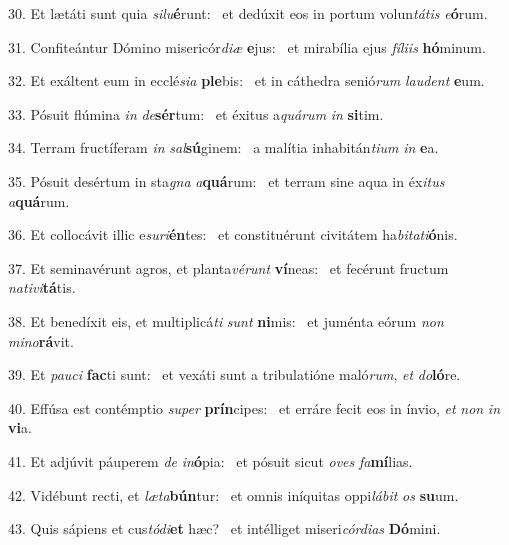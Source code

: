 30. Et lætáti sunt quia \textit{si}\textit{lu}\textbf{é}runt: \ast\  et dedúxit eos in portum volun\textit{tá}\textit{tis} \textit{e}\textbf{ó}rum.\

31. Confiteántur Dómino misericór\textit{di}\textit{æ} \textbf{e}jus: \ast\  et mirabília ejus \textit{fí}\textit{li}\textit{is} \textbf{hó}minum.\

32. Et exáltent eum in ecclé\textit{si}\textit{a} \textbf{ple}bis: \ast\  et in cáthedra senió\textit{rum} \textit{lau}\textit{dent} \textbf{e}um.\

33. Pósuit flúmina \textit{in} \textit{de}\textbf{sér}tum: \ast\  et éxitus a\textit{quá}\textit{rum} \textit{in} \textbf{si}tim.\

34. Terram fructíferam \textit{in} \textit{sal}\textbf{sú}ginem: \ast\  a malítia inhabitán\textit{ti}\textit{um} \textit{in} \textbf{e}a.\

35. Pósuit desértum in sta\textit{gna} \textit{a}\textbf{quá}rum: \ast\  et terram sine aqua in éx\textit{i}\textit{tus} \textit{a}\textbf{quá}rum.\

36. Et collocávit illic e\textit{su}\textit{ri}\textbf{én}tes: \ast\  et constituérunt civitátem ha\textit{bi}\textit{ta}\textit{ti}\textbf{ó}nis.\

37. Et seminavérunt agros, et planta\textit{vé}\textit{runt} \textbf{ví}neas: \ast\  et fecérunt fructum \textit{na}\textit{ti}\textit{vi}\textbf{tá}tis.\

38. Et benedíxit eis, et multiplicá\textit{ti} \textit{sunt} \textbf{ni}mis: \ast\  et juménta eórum \textit{non} \textit{mi}\textit{no}\textbf{rá}vit.\

39. Et \textit{pau}\textit{ci} \textbf{fac}ti sunt: \ast\  et vexáti sunt a tribulatióne maló\textit{rum}, \textit{et} \textit{do}\textbf{ló}re.\

40. Effúsa est contémptio \textit{su}\textit{per} \textbf{prín}cipes: \ast\  et erráre fecit eos in ínvio, \textit{et} \textit{non} \textit{in} \textbf{vi}a.\

41. Et adjúvit páuperem \textit{de} \textit{in}\textbf{ó}pia: \ast\  et pósuit sicut \textit{o}\textit{ves} \textit{fa}\textbf{mí}lias.\

42. Vidébunt recti, et \textit{læ}\textit{ta}\textbf{bún}tur: \ast\  et omnis iníquitas oppi\textit{lá}\textit{bit} \textit{os} \textbf{su}um.\

43. Quis sápiens et cus\textit{tó}\textit{di}\textbf{et} hæc? \ast\  et intélliget miseri\textit{cór}\textit{di}\textit{as} \textbf{Dó}mini.\

